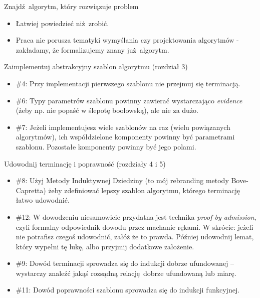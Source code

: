 \documentclass{beamer}
\begin{document}
\begin{frame}{Znajdź algorytm, który rozwiązuje problem}
\begin{itemize}
	\item Łatwiej powiedzieć niż zrobić.
	\item Praca nie porusza tematyki wymyślania czy projektowania algorytmów - zakładamy, że formalizujemy znany już algorytm.
\end{itemize}
\end{frame}

\begin{frame}{Zaimplementuj abstrakcyjny szablon algorytmu (rozdział 3)}
\begin{itemize}
	\item \#4: Przy implementacji pierwszego szablonu nie przejmuj się terminacją.
	\item \#6: Typy parametrów szablonu powinny zawierać wystarczająco \textit{evidence} (żeby np. nie popaść w ślepotę boolowską), ale nie za dużo.
	\item \#7: Jeżeli implementujesz wiele szablonów na raz (wielu powiązanych algorytmów), ich współdzielone komponenty powinny być parametrami szablonu. Pozostałe komponenty powinny być jego polami.
\end{itemize}
\end{frame}

\begin{frame}{Udowodnij terminację i poprawność (rozdziały 4 i 5)}
\begin{itemize}
	\item \#8: Użyj Metody Induktywnej Dziedziny (to mój rebranding metody Bove-Capretta) żeby zdefiniować lepszy szablon algorytmu, którego terminację łatwo udowodnić.
	\item \#12: W dowodzeniu niesamowicie przydatna jest technika \textit{proof by admission}, czyli formalny odpowiednik dowodu przez machanie rękami. W skrócie: jeżeli nie potrafisz czegoś udowodnić, załóż że to prawda. Później udowodnij lemat, który wypełni tę lukę, albo przyjmij dodatkowe założenie.
	\item \#9: Dowód terminacji sprowadza się do indukcji dobrze ufundowanej -- wystarczy znaleźć jakąś rozsądną relację dobrze ufundowaną lub miarę.
	\item \#11: Dowód poprawności szablonu sprowadza się do indukcji funkcyjnej.
\end{itemize}
\end{frame}
\end{document}
